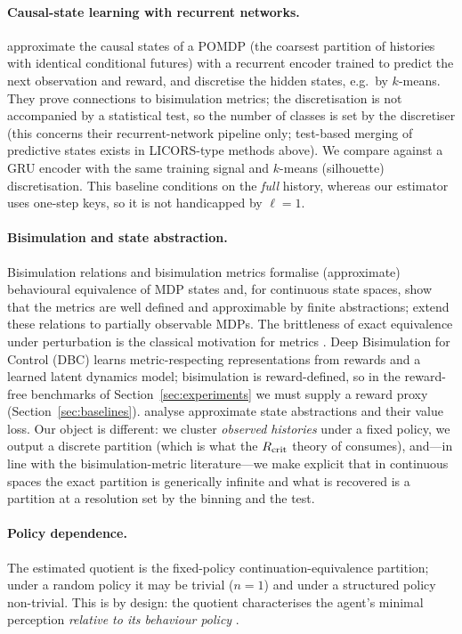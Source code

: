 \documentclass[10pt]{article}
\begin{document}
\paragraph{Causal-state learning with recurrent networks.}
\citet{Zhang2019causal} approximate the causal states of a POMDP (the coarsest
partition of histories with identical conditional futures) with a recurrent
encoder trained to predict the next observation and reward, and discretise the
hidden states, e.g.\ by $k$-means.  They prove connections to bisimulation
metrics; the discretisation is not accompanied by a statistical test, so the
number of classes is set by the discretiser (this concerns their recurrent-network
pipeline only; test-based merging of predictive states exists in LICORS-type
methods above).  We compare against a GRU
encoder with the same training signal and $k$-means (silhouette) discretisation.
This baseline conditions on the \emph{full} history, whereas our estimator
uses one-step keys, so it is not handicapped by $\ell=1$.

\paragraph{Bisimulation and state abstraction.}
Bisimulation relations \citep{Larsen1991} and bisimulation metrics
\citep{Ferns2004,Castro2020} formalise (approximate) behavioural equivalence of
MDP states and, for continuous state spaces, \citet{Ferns2011} show that the
metrics are well defined and approximable by finite abstractions;
\citet{Castro2009} extend these relations to partially observable
MDPs.  The brittleness of exact equivalence under perturbation is the classical
motivation for metrics \citep{Ferns2004}.  Deep Bisimulation for Control (DBC)
\citep{Zhang2020} learns metric-respecting representations from rewards and a
learned latent dynamics model; bisimulation is reward-defined, so in the
reward-free benchmarks of Section~\ref{sec:experiments} we must supply a
reward proxy (Section~\ref{sec:baselines}).  \citet{Abel2020}
analyse approximate state abstractions and their value loss.  Our object is
different: we cluster \emph{observed histories} under a fixed policy, we output
a discrete partition (which is what the $R_{\rm crit}$ theory of
\citet{nixon2026rcrit} consumes), and---in line with the bisimulation-metric
literature---we make explicit that in continuous spaces the exact partition is
generically infinite and what is recovered is a partition at a resolution set
by the binning and the test.

\paragraph{Policy dependence.}
The estimated quotient is the fixed-policy continuation-equivalence partition;
under a random policy it may be trivial ($n{=}1$) and under a structured policy
non-trivial.  This is by design: the quotient characterises the agent's minimal
perception \emph{relative to its behaviour policy} \citep{nixon2026quotient}.
\end{document}
